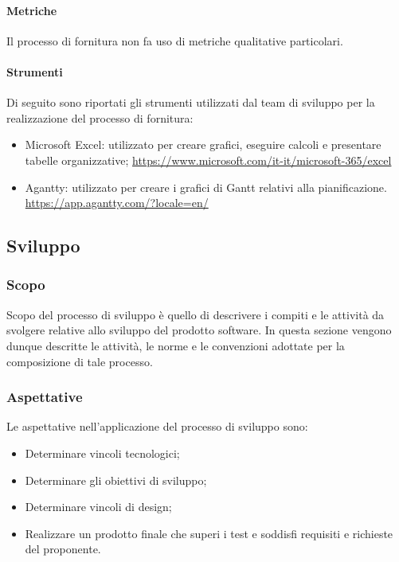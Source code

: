 \paragraph{Metriche}\label{paragraph: metriche_fornitura}
Il processo di fornitura non fa uso di metriche qualitative particolari.
\paragraph{Strumenti}\label{paragraph: strumenti_fornitura}
Di seguito sono riportati gli strumenti utilizzati dal team di sviluppo per la realizzazione del processo di fornitura:
\begin{itemize}
    \item Microsoft Excel: utilizzato per creare grafici, eseguire calcoli e presentare tabelle organizzative; 
    \url{https://www.microsoft.com/it-it/microsoft-365/excel}
    \item Agantty: utilizzato per creare i grafici di Gantt relativi alla pianificazione. 
    \url{https://app.agantty.com/?locale=en/}
\end{itemize}

\pagebreak

\subsection{Sviluppo} \label{subsection:Sviluppo}
    \subsubsection{Scopo} \label{subsubsection:Sviluppo_Scopo}
    Scopo del processo di sviluppo è quello di descrivere i compiti e le attività da svolgere relative allo sviluppo del prodotto software.
    In questa sezione vengono dunque descritte le attività, le norme e le convenzioni adottate per la composizione di tale processo.

    \subsubsection{Aspettative} \label{subsubsection:Sviluppo_Aspettative}
    Le aspettative nell’applicazione del processo di sviluppo sono:
    \begin{itemize}
        \item Determinare vincoli tecnologici;
        \item Determinare gli obiettivi di sviluppo;
        \item Determinare vincoli di design;
        \item Realizzare un prodotto finale che superi i test e soddisfi requisiti e richieste del proponente.
    \end{itemize}

